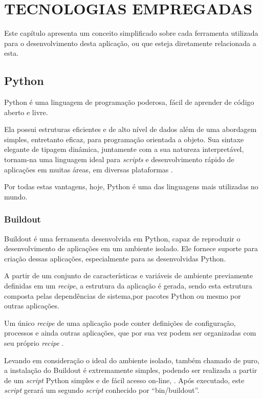 \chapter{TECNOLOGIAS EMPREGADAS}
\thispagestyle{empty}

Este capítulo apresenta um conceito simplificado sobre cada ferramenta utilizada para o desenvolvimento desta aplicação, ou que esteja diretamente relacionada a esta.


\section{Python}

Python é uma linguagem de programação poderosa, fácil de aprender de código aberto e livre. 

Ela possui estruturas eficientes e de alto nível de dados além de uma abordagem simples, entretanto eficaz, para programação orientada a objeto. Sua sintaxe elegante de tipagem dinâmica, juntamente com a sua natureza interpretável, tornam-na uma linguagem ideal para \textit{scripts} e desenvolvimento rápido de aplicações em muitas áreas, em diversas plataformas \cite{GUIDO}.

Por todas estas vantagens, hoje, Python é uma das linguagens mais utilizadas no mundo.


\subsection{Buildout}
\label{Buildout}

Buildout é uma ferramenta desenvolvida em Python, capaz de reproduzir o desenvolvimento de aplicações em um ambiente isolado. Ele fornece suporte para criação dessas aplicações, especialmente para as desenvolvidas Python. 

A partir de um conjunto de características e variáveis de ambiente previamente definidas em um \textit{recipe}, a estrutura da aplicação é gerada, sendo esta estrutura composta pelas dependências de sistema,por pacotes Python ou mesmo por outras aplicações.

Um único \textit{recipe} de uma aplicação pode conter definições de configuração, processos e ainda outras aplicações, que por sua vez podem ser organizadas com seu próprio \textit{recipe} \cite{BRANDOM}.

Levando em consideração o ideal do ambiente isolado, também chamado de puro, a instalação do Buildout é extremamente simples, podendo ser realizada a partir de um \textit{script} Python simples e de fácil acesso on-line, \cite{BOOTSTRAP}. Após executado, este \textit{script} gerará um segundo \textit{script} conhecido por ``bin/buildout''. 

